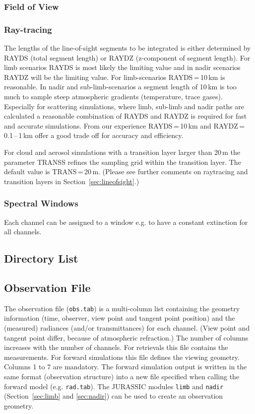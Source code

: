 \subsubsection{Field of View}
\todo

\subsubsection{Ray-tracing}
The lengths of the line-of-sight segments to be integrated is either determined by RAYDS (total segment length) or RAYDZ (z-component of segment length). For limb scenarios RAYDS is most likely the limiting value and in nadir scenarios RAYDZ will be the limiting value. For limb-scenarios RAYDS\,=\,10\,km is reasonable. In nadir and sub-limb-scenarios a segment length of 10\,km is too much to sample steep atmospheric gradients (temperature, trace gases). Especially for scattering simulations, where limb, sub-limb and nadir paths are calculated a reasonable combination of RAYDS and RAYDZ is required for fast and accurate simulations. From our experience RAYDS\,=\,10\,km and RAYDZ\,=\,0.1\,--\,1\,km offer a good trade off for accuracy and efficiency. 

For cloud and aerosol simulations with a transition layer larger than 20\,m the parameter TRANSS refines the sampling grid within the transition layer. The default value is TRANS\,=\,20\,m. (Please see further comments on raytracing and transition layers in Section~\ref{sec:lineofsight}.)

\subsubsection{Spectral Windows}
Each channel can be assigned to a window e.g. to have a constant extinction for all channels.

\subsection{Directory List}
\label{sec:DirlistFile}
\todo


\subsection{Observation File}
\label{sec:ObservationFile}
The observation file (\texttt{obs.tab}) is a multi-column list containing the geometry information (time, observer, view point and tangent point position) and the (measured) radiances (and/or transmittances) for each channel. (View point and tangent point differ, because of atmospheric refraction.) The number of columns increases with the number of channels. For retrievals this file contains the measurements. For forward simulations this file defines the viewing geometry. Columns 1 to 7 are mandatory. The forward simulation output is written in the same format (observation structure) into a new file specified when calling the forward model (e.g. \texttt{rad.tab}). The JURASSIC modules \texttt{limb} and \texttt{nadir} (Section~\ref{sec:limb} and \ref{sec:nadir}) can be used to create an observation geometry.

